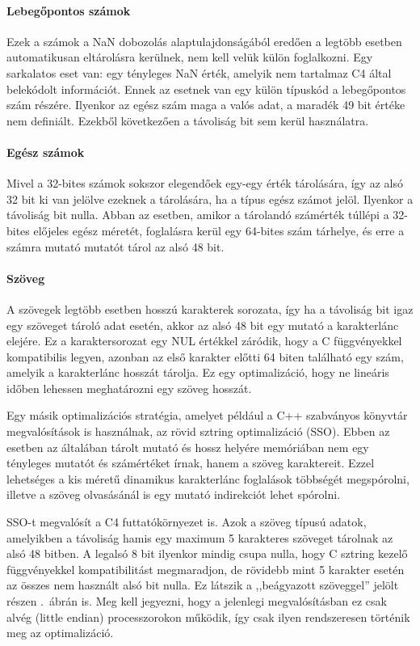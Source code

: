 \paragraph{Lebegőpontos számok} Ezek a számok a \gls{NaN} dobozolás alaptulajdonságából eredően a legtöbb esetben automatikusan eltárolásra kerülnek, nem kell velük külön foglalkozni.
Egy sarkalatos eset van: egy tényleges \gls{NaN} érték, amelyik nem tartalmaz C4 által belekódolt információt.
Ennek az esetnek van egy külön típuskód a lebegőpontos szám részére.
Ilyenkor az egész szám maga a valós adat, a maradék 49 bit értéke nem definiált.
Ezekből következően a távoliság bit sem kerül használatra.

\paragraph{Egész számok} Mivel a 32-bites számok sokszor elegendőek egy-egy érték tárolására, így az alsó 32 bit ki van jelölve ezeknek a tárolására, ha a típus egész számot jelöl.
Ilyenkor a távoliság bit nulla.
Abban az esetben, amikor a tárolandó számérték túllépi a 32-bites előjeles egész méretét, foglalásra kerül egy 64-bites szám tárhelye, és erre a számra mutató mutatót tárol az alsó 48 bit.

\paragraph{Szöveg} A szövegek legtöbb esetben hosszú karakterek sorozata, így ha a távoliság bit igaz egy szöveget tároló adat esetén, akkor az alsó 48 bit egy mutató a karakterlánc elejére.
Ez a karaktersorozat egy  NUL értékkel záródik, hogy a C függvényekkel kompatibilis legyen, azonban az első karakter előtti 64 biten található egy szám, amelyik a karakterlánc hosszát tárolja.
Ez egy optimalizáció, hogy ne lineáris időben lehessen meghatározni egy szöveg hosszát.

Egy másik optimalizációs stratégia, amelyet például a C++ szabványos könyvtár megvalósítások is használnak, az \un rövid sztring optimalizáció (\gls{SSO}).
Ebben az esetben az általában tárolt mutató és hossz helyére memóriában nem egy tényleges mutatót és számértéket írnak, hanem a szöveg karaktereit.
Ezzel lehetséges a kis méretű dinamikus karakterlánc foglalások többségét megspórolni, illetve a szöveg olvasásánál is egy mutató indirekciót lehet spórolni.

\gls{SSO}-t megvalósít a C4 futtatókörnyezet is.
Azok a szöveg típusú adatok, amelyikben a távoliság hamis egy maximum 5 karakteres szöveget tárolnak az alsó 48 bitben.
A legalsó 8 bit ilyenkor mindig csupa nulla, hogy C sztring kezelő függvényekkel kompatibilitást megmaradjon, de rövidebb mint 5 karakter esetén az összes nem használt alsó bit nulla.
Ez látszik a ,,beágyazott szöveggel'' jelölt részen .~ábrán is.
Meg kell jegyezni, hogy a jelenlegi megvalósításban ez csak alvég (little endian) processzorokon működik, így csak ilyen rendszeresen történik meg az optimalizáció.

